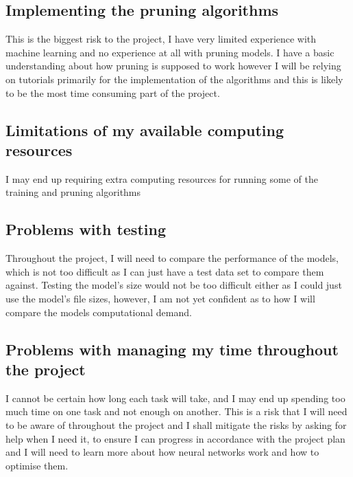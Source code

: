 \documentclass{article}
\begin{document}
\subsection{Implementing the pruning algorithms}
This is the biggest risk to the project, I have very limited experience with machine learning and no experience at all with pruning models. I have a basic understanding about how pruning is supposed to work however I will be relying on tutorials primarily for the implementation of the algorithms and this is likely to be the most time consuming part of the project.

\subsection{Limitations of my available computing resources}
I may end up requiring extra computing resources for running some of the training and pruning algorithms 

\subsection{Problems with testing}
Throughout the project, I will need to compare the performance of the models, which is not too difficult as I can just have a test data set to compare them against. Testing the model's size would not be too difficult either as I could just use the model's file sizes, however, I am not yet confident as to how I will compare the models computational demand.

\subsection{Problems with managing my time throughout the project}
I cannot be certain how long each task will take, and I may end up spending too much time on one task and not enough on another.
This is a risk that I will need to be aware of throughout the project and I shall mitigate the risks by asking for help when I need it, to ensure I can progress in accordance with the project plan and I will need to learn more about how neural networks work 
and how to optimise them.

\pagebreak

\printbibliography
\end{document}
